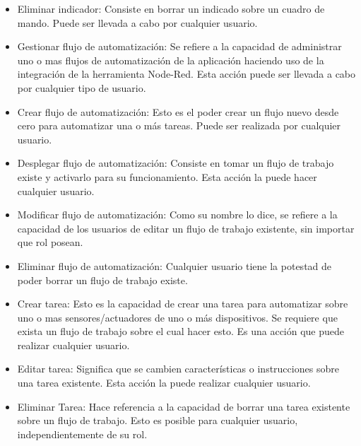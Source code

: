 \begin{itemize}
\item Eliminar indicador: Consiste en borrar un indicado sobre un cuadro de mando. Puede ser llevada a cabo por cualquier usuario.
\item Gestionar flujo de automatización: Se refiere a la capacidad de administrar uno o mas flujos de automatización de la aplicación haciendo uso de la integración de la herramienta Node-Red. Esta acción puede ser llevada a cabo por cualquier tipo de usuario.
\item Crear flujo de automatización: Esto es el poder crear un flujo nuevo desde cero para automatizar una o más tareas. Puede ser realizada por cualquier usuario.
\item Desplegar flujo de automatización: Consiste en tomar un flujo de trabajo existe y activarlo para su funcionamiento. Esta acción la puede hacer cualquier usuario.
\item Modificar flujo de automatización: Como su nombre lo dice, se refiere a la capacidad de los usuarios de editar un flujo de trabajo existente, sin importar que rol posean. 
\item Eliminar flujo de automatización: Cualquier usuario tiene la potestad de poder borrar un flujo de trabajo existe.
\item Crear tarea: Esto es la capacidad de crear una tarea para automatizar sobre uno o mas sensores/actuadores de uno o más dispositivos. Se requiere que exista un flujo de trabajo sobre el cual hacer esto. Es una acción que puede realizar cualquier usuario.
\item Editar tarea: Significa que se cambien características o instrucciones sobre una  tarea existente. Esta acción la puede realizar cualquier usuario.
\item Eliminar Tarea: Hace referencia a la capacidad de borrar una tarea existente sobre un flujo de trabajo. Esto es posible para cualquier usuario, independientemente de su rol.
\end{itemize}